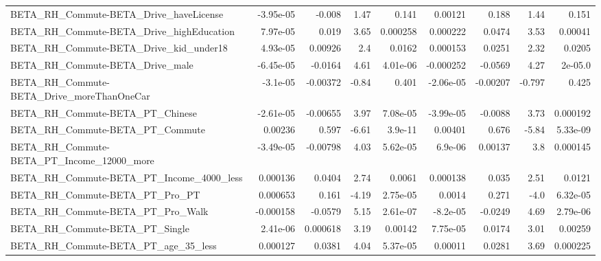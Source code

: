 \begin{tabular}{lrrrrrrrr}
BETA\_RH\_Commute-BETA\_Drive\_haveLicense             &   -3.95e-05 &       -0.008 &      1.47 &    0.141 &    0.00121 &       0.188 &         1.44 &         0.151 \\
BETA\_RH\_Commute-BETA\_Drive\_highEducation           &    7.97e-05 &        0.019 &      3.65 & 0.000258 &   0.000222 &      0.0474 &         3.53 &       0.00041 \\
BETA\_RH\_Commute-BETA\_Drive\_kid\_under18             &    4.93e-05 &      0.00926 &       2.4 &   0.0162 &   0.000153 &      0.0251 &         2.32 &        0.0205 \\
BETA\_RH\_Commute-BETA\_Drive\_male                    &   -6.45e-05 &      -0.0164 &      4.61 & 4.01e-06 &  -0.000252 &     -0.0569 &         4.27 &       2e-05.0 \\
BETA\_RH\_Commute-BETA\_Drive\_moreThanOneCar          &    -3.1e-05 &     -0.00372 &     -0.84 &    0.401 &  -2.06e-05 &    -0.00207 &       -0.797 &         0.425 \\
BETA\_RH\_Commute-BETA\_PT\_Chinese                    &   -2.61e-05 &     -0.00655 &      3.97 & 7.08e-05 &  -3.99e-05 &     -0.0088 &         3.73 &      0.000192 \\
BETA\_RH\_Commute-BETA\_PT\_Commute                    &     0.00236 &        0.597 &     -6.61 &  3.9e-11 &    0.00401 &       0.676 &        -5.84 &      5.33e-09 \\
BETA\_RH\_Commute-BETA\_PT\_Income\_12000\_more          &   -3.49e-05 &     -0.00798 &      4.03 & 5.62e-05 &    6.9e-06 &     0.00137 &          3.8 &      0.000145 \\
BETA\_RH\_Commute-BETA\_PT\_Income\_4000\_less           &    0.000136 &       0.0404 &      2.74 &   0.0061 &   0.000138 &       0.035 &         2.51 &        0.0121 \\
BETA\_RH\_Commute-BETA\_PT\_Pro\_PT                     &    0.000653 &        0.161 &     -4.19 & 2.75e-05 &     0.0014 &       0.271 &         -4.0 &      6.32e-05 \\
BETA\_RH\_Commute-BETA\_PT\_Pro\_Walk                   &   -0.000158 &      -0.0579 &      5.15 & 2.61e-07 &   -8.2e-05 &     -0.0249 &         4.69 &      2.79e-06 \\
BETA\_RH\_Commute-BETA\_PT\_Single                     &    2.41e-06 &     0.000618 &      3.19 &  0.00142 &   7.75e-05 &      0.0174 &         3.01 &       0.00259 \\
BETA\_RH\_Commute-BETA\_PT\_age\_35\_less                &    0.000127 &       0.0381 &      4.04 & 5.37e-05 &    0.00011 &      0.0281 &         3.69 &      0.000225 \\

\end{tabular}

